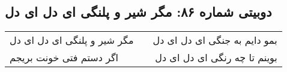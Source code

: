 \begin{center}
\section*{دوبیتی شماره ۸۶: مگر شیر و پلنگی ای دل ای دل}
\label{sec:086}
\begin{longtable}{l p{0.5cm} r}
مگر شیر و پلنگی ای دل ای دل
&&
بمو دایم به جنگی ای دل ای دل
\\
اگر دستم فتی خونت بریجم
&&
بوینم تا چه رنگی ای دل ای دل
\\
\end{longtable}
\end{center}
